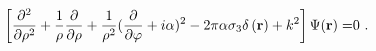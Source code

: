 \begin{equation}
\left[ \frac{\partial ^{2}}{\partial \rho ^{2}}+\frac{1}{\rho }\frac{%
\partial }{\partial \rho }+\frac{1}{\rho ^{2}}(\frac{\partial }{\partial
\varphi }+i\alpha )^{2}-2\pi \alpha \sigma _{3}\delta \left( \mathbf{r}%
\right) +k^{2}\right] \Psi (\mathbf{r)=}0\ .
\end{equation}

